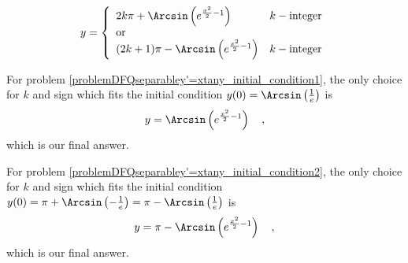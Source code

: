 {\[
y=\left\{\begin{array}{ll} 2 k \pi+\Arcsin\left( e^{\frac{x^2}{2}-1} \right) &{k -\text{integer}} \\{\text{or}}\\{(2k+1)\pi- \Arcsin\left( e^{\frac{x^2}{2}-1} \right)}&{k-\text{integer}}\end{array}\right.
\]

For problem \ref{problemDFQseparabley'=xtany_initial_condition1}, 
the only choice for $k$ and sign which fits the initial condition $y(0)= \Arcsin\left(\frac{1}{e}\right)$ is
\[
y=\Arcsin\left(e^{\frac{x^2}{2}-1} \right)\quad ,
\]
which is our final answer. 

For problem \ref{problemDFQseparabley'=xtany_initial_condition2}, 
the only choice for $k$ and sign which fits the initial condition $y(0)=\pi+ \Arcsin\left(-\frac{1}{e}\right)=\pi- \Arcsin \left( \frac{1}{e}\right) $ is
\[
y=\pi- \Arcsin\left(e^{\frac{x^2}{2}-1} \right)\quad, 
\]
which is our final answer.
}
